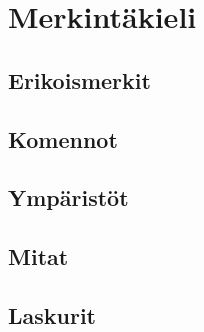 \chapter{Merkintäkieli}
\section{Erikoismerkit}
\section{Komennot}
\section{Ympäristöt}
\section{Mitat}
\section{Laskurit}
